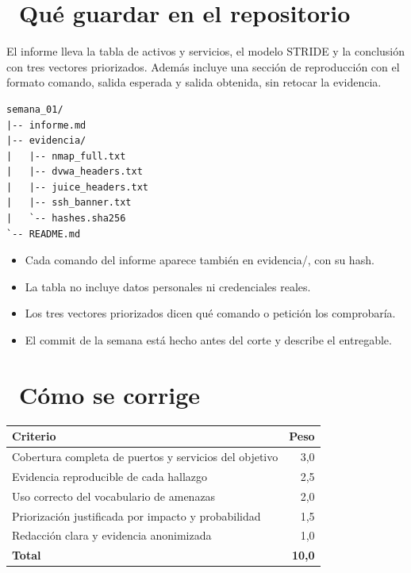 \documentclass[11pt,a4paper]{article}
\newcommand{\iconotexto}[2]{\textcolor{cyanNeon}{\faIcon{#1}}~#2}
\begin{document}
\section{\iconotexto{box-open}{Qué guardar en el repositorio}}

El informe lleva la tabla de activos y servicios, el modelo STRIDE y la conclusión con tres vectores priorizados. Además incluye una sección de reproducción con el formato comando, salida esperada y salida obtenida, sin retocar la evidencia.

\begin{lstlisting}[style=estiloCodigo]
semana_01/
|-- informe.md
|-- evidencia/
|   |-- nmap_full.txt
|   |-- dvwa_headers.txt
|   |-- juice_headers.txt
|   |-- ssh_banner.txt
|   `-- hashes.sha256
`-- README.md
\end{lstlisting}

\begin{itemize}[leftmargin=1.4em,itemsep=2pt,topsep=3pt]
  \item Cada comando del informe aparece también en evidencia/, con su hash.
  \item La tabla no incluye datos personales ni credenciales reales.
  \item Los tres vectores priorizados dicen qué comando o petición los comprobaría.
  \item El commit de la semana está hecho antes del corte y describe el entregable.
\end{itemize}

\section{\iconotexto{ruler-combined}{Cómo se corrige}}

\begin{tabularx}{\linewidth}{@{}X r@{}}
\toprule
Criterio & Peso\\
\midrule
Cobertura completa de puertos y servicios del objetivo & 3,0 \\
Evidencia reproducible de cada hallazgo & 2,5 \\
Uso correcto del vocabulario de amenazas & 2,0 \\
Priorización justificada por impacto y probabilidad & 1,5 \\
Redacción clara y evidencia anonimizada & 1,0 \\
\midrule
\textbf{Total} & \textbf{10,0}\\
\bottomrule
\end{tabularx}
\end{document}
